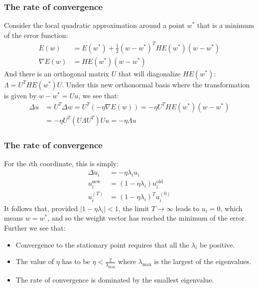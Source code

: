 \documentclass{beamer}
\begin{document}
\begin{frame}
    \frametitle{The rate of convergence}
    Consider the local quadratic approximation around a point $w^{*}$ that is a minimum of the error function:
    \begin{align*}
        E(w)&=E(w^{*})+\frac{1}{2}(w-w^{*})^{T}HE(w^{*})(w-w^{*}) \\
        \nabla{}E(w)&=HE(w^{*})(w-w^{*})
    \end{align*}
    And there is an orthogonal matrix $U$ that will diagonalize $HE(w^{*})$: $\Lambda=U^{T}HE(w^{*})U$. Under this new orthonormal basis where the transformation is given by $w-w^{*}=Uu$, we see that:
    \begin{align*}
        \Delta{}u&=U^{T}\Delta{}w=U^{T}(-\eta\nabla{}E(w))=-\eta{}U^{T}HE(w^{*})(w-w^{*}) \\
        &=-\eta{}U^{T}(U\Lambda{}U^{T})Uu=-\eta\Lambda{}u
    \end{align*}
\end{frame}

\begin{frame}
    \frametitle{The rate of convergence}
    For the $i$th coordinate, this is simply:
    \begin{align*}
        \Delta{}u_{i}&=-\eta\lambda_{i}u_{i} \\
        u_{i}^{\textrm{new}}&=(1-\eta\lambda_{i})u_{i}^{\textrm{old}} \\
        u_{i}^{(T)}&=(1-\eta\lambda_{i})^{T}u_{i}^{(0)}
    \end{align*}
    It follows that, provided $|1-\eta\lambda_{i}|<1$, the limit $T\to\infty$ leads to $u_{i}=0$, which means $w=w^{*}$, and so the weight vector has reached the minimum of the error. Further we see that:
    \begin{itemize}
        \item Convergence to the stationary point requires that all the $\lambda_{i}$ be positive.
        \item The value of $\eta$ has to be $\eta<\frac{2}{\lambda_{\textrm{max}}}$ where $\lambda_{\textrm{max}}$ is the largest of the eigenvalues.
        \item The rate of convergence is dominated by the smallest eigenvalue.
    \end{itemize}
\end{frame}
\end{document}
